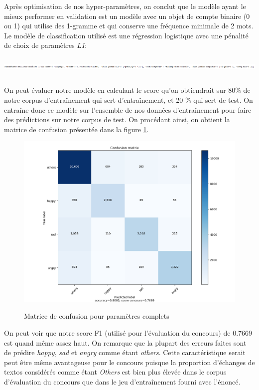Après optimisation de nos hyper-paramètres, on conclut que le modèle ayant le mieux performer en validation est un modèle avec un objet de compte binaire (0 ou 1) qui utilise des 1-gramme et qui conserve une fréquence minimale de 2 mots. Le modèle de classification utilisé est une régression logistique avec une pénalité de choix de paramètres \emph{L1}:

\includegraphics[width=\linewidth,height=1cm,keepaspectratio]{images/dict_meilleur_model}

On peut évaluer notre modèle en calculant le score qu'on obtiendrait sur 80\% de notre corpus d'entraînement qui sert d'entraînement, et 20 \% qui sert de test.
On entraîne donc ce modèle sur l'ensemble de nos données d'entraînement pour faire des prédictions sur notre corpus de test.
On procédant ainsi, on obtient la matrice de confusion présentée dans la figure \ref{fig:full_confusion}.

\begin{figure}
	\caption{Matrice de confusion pour paramètres complets}
	\centering
	\includegraphics[width=\linewidth,keepaspectratio]{images/confusion_matrix_avec_features}
	\label{fig:full_confusion}
\end{figure}

On peut voir que notre score F1 (utilisé pour l'évaluation du concours) de 0.7669 est quand même assez haut. 
On remarque que la plupart des erreurs faites sont de prédire \emph{happy}, \emph{sad} et \emph{angry} comme étant \emph{others}. Cette caractéristique serait peut être même avantageuse pour le concours puisque la proportion d'échanges de textos considérés comme étant \emph{Others} est bien plus élevée dans le corpus d'évaluation du concours que dans le jeu d'entraînement fourni avec l'énoncé.

